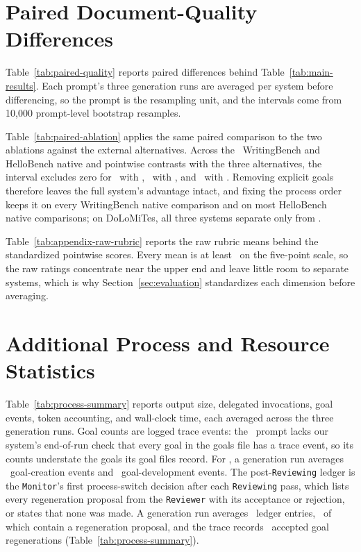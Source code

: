 \section{Paired Document-Quality Differences}
\label{app:paired-quality}
Table~\ref{tab:paired-quality} reports paired differences behind Table~\ref{tab:main-results}.
Each prompt's three generation runs are averaged per system before differencing, so the prompt is the resampling unit, and the intervals come from 10,000 prompt-level bootstrap resamples.


Table~\ref{tab:paired-ablation} applies the same paired comparison to the two ablations against the external alternatives.
Across the \PairedSeparationMeasureCount\ WritingBench and HelloBench native and pointwise contrasts with the three alternatives, the interval excludes zero for \PairedSeparatedFull\ with \condAgenticCogWriter, \PairedSeparatedNoGoals\ with \condNoGoals, and \PairedSeparatedFixedOrder\ with \condFixedOrder.
Removing explicit goals therefore leaves the full system's advantage intact, and fixing the process order keeps it on every WritingBench native comparison and on most HelloBench native comparisons; on DoLoMiTes, all three systems separate only from \condTaskPlanning.


Table~\ref{tab:appendix-raw-rubric} reports the raw rubric means behind the standardized pointwise scores.
Every mean is at least \RawRubricMin\ on the five-point scale, so the raw ratings concentrate near the upper end and leave little room to separate systems, which is why Section~\ref{sec:evaluation} standardizes each dimension before averaging.


\section{Additional Process and Resource Statistics}
\label{app:process-behavior}
Table~\ref{tab:process-summary} reports output size, delegated invocations, goal events, token accounting, and wall-clock time, each averaged across the three generation runs.
Goal counts are logged trace events: the \condFixedOrder\ prompt lacks our system's end-of-run check that every goal in the goals file has a trace event, so its counts understate the goals its goal files record.
For \condAgenticCogWriter, a generation run averages \AfourGoalCreatedMean\ goal-creation events and \AfourGoalDevelopedMean\ goal-development events.
The post-\texttt{Reviewing} ledger is the \texttt{Monitor}'s first process-switch decision after each \texttt{Reviewing} pass, which lists every regeneration proposal from the \texttt{Reviewer} with its acceptance or rejection, or states that none was made.
A generation run averages \AfourLedgerEntriesMean\ ledger entries, \AfourLedgerWithProposalMean\ of which contain a regeneration proposal, and the trace records \AfourGoalRegeneratedMean\ accepted goal regenerations (Table~\ref{tab:process-summary}).


